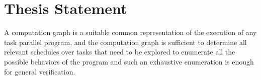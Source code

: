 \section{Thesis Statement}
A computation graph is a suitable common representation of the execution of any task parallel program, and the computation graph is sufficient to determine all relevant schedules over tasks that need to be explored to enumerate all the possible behaviors of the program and such an exhaustive enumeration is enough for general verification.
